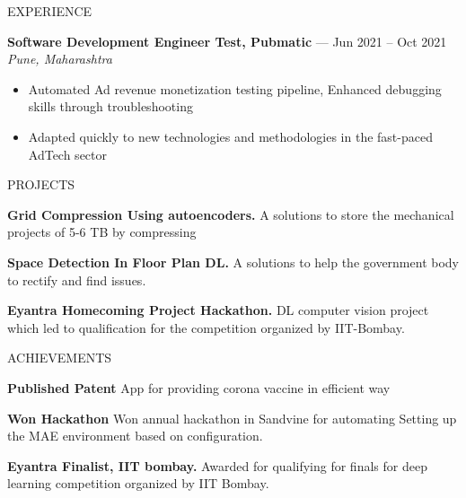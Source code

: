 \documentclass{resume} %
\begin{document}
\begin{rSection}{EXPERIENCE}
\begin{itemize}
{ \end{itemize}
 
\textbf{Software Development Engineer Test, Pubmatic} --- Jun 2021 -- Oct 2021\\
\textit{Pune, Maharashtra}\\
 \begin{itemize}
    \itemsep -6pt 
     \item Automated Ad revenue monetization testing pipeline, Enhanced debugging skills through troubleshooting
    \item Adapted quickly to new technologies and methodologies in the fast-paced AdTech sector
 \end{itemize}
\end{rSection} 


\begin{rSection}{PROJECTS}

\itemsep -6pt 
\item \textbf{Grid Compression Using autoencoders.} {A solutions to store the mechanical projects of 5-6 TB by compressing}
\item \textbf{Space Detection In Floor Plan DL.} {A solutions to help the government body to rectify and find issues.}
\item \textbf{Eyantra Homecoming Project Hackathon.} {DL computer vision project which led to qualification for the competition organized by IIT-Bombay.}
\end{rSection} 



\begin{rSection}{ACHIEVEMENTS}

\itemsep -6pt 
\item \textbf{Published Patent} {App for providing corona vaccine in efficient way}
\item \textbf{Won Hackathon} {Won annual hackathon in Sandvine for automating Setting up the MAE environment based on configuration.}
\item \textbf{Eyantra Finalist, IIT bombay.} {Awarded for qualifying for finals for deep learning competition organized by IIT Bombay.}
\end{rSection} 
\end{document}
